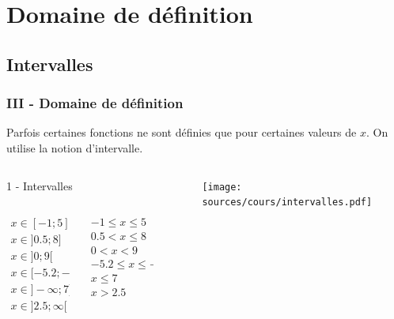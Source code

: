 \documentclass{beamer}
\begin{document}
\section{ Domaine de définition}
\subsection{Intervalles}

\begin{frame}
  \frametitle{III - Domaine de définition}

  \begin{block}{}	
    Parfois certaines fonctions ne sont définies que pour certaines valeurs de $x$. On utilise la notion d'intervalle.
  \end{block}

  \begin{columns}[t]
    \begin{column}{6cm}

      \begin{block}{1 - Intervalles}

        \begin{columns}[t]
          \begin{column}{3cm}
            \begin{eqnarray*}
    x \in [-1      ; 5     ]\\
    x \in ] 0.5    ; 8     ]\\
    x \in ] 0      ; 9     [\\
    x \in [-5.2    ; -2    [\\
    x \in ]-\infty ; 7     ]\\
    x \in ] 2.5    ; \infty[\\
  \end{eqnarray*}


          \end{column}
          \begin{column}{3cm}  
  \begin{eqnarray*}
    -1   \leq x \leq  5\\
    0.5  <    x \leq  8\\
    0    <    x <     9\\
    -5.2 \leq x \leq -2\\
    x    \leq 7\\
    x    > 2.5\\
  \end{eqnarray*}
          \end{column}
        \end{columns} 

      \end{block}
    \end{column}
    \begin{column}{4cm}  
      \begin{figure}[H]
        \centering
        \texttt{[image: sources/cours/intervalles.pdf]}
      \end{figure}
    \end{column}
  \end{columns} 

\end{frame}
\end{document}
